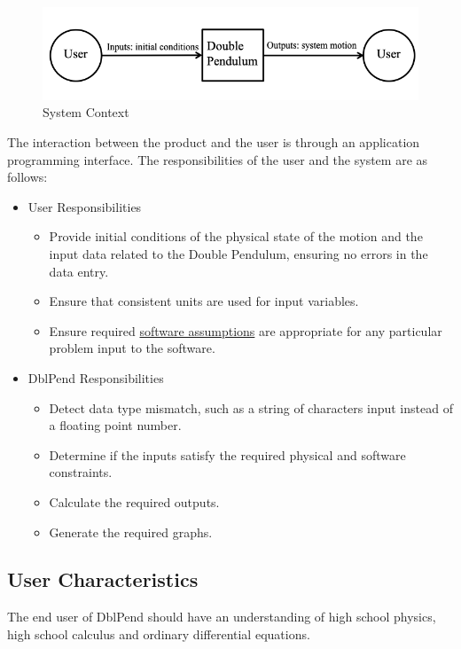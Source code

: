 \documentclass[12pt]{article}
\begin{document}
{\begin{figure}[H]
\begin{center}
\includegraphics[width=\textwidth]{../../../../datafiles/dblpend/SystemContextFigure.png}
\caption{System Context}
\label{Figure:sysCtxDiag}
\end{center}
\end{figure}
The interaction between the product and the user is through an application programming interface. The responsibilities of the user and the system are as follows:

\begin{itemize}
\item{User Responsibilities}
\begin{itemize}
\item{Provide initial conditions of the physical state of the motion and the input data related to the Double Pendulum, ensuring no errors in the data entry.}
\item{Ensure that consistent units are used for input variables.}
\item{Ensure required \hyperref[Sec:Assumps]{software assumptions} are appropriate for any particular problem input to the software.}
\end{itemize}
\item{DblPend Responsibilities}
\begin{itemize}
\item{Detect data type mismatch, such as a string of characters input instead of a floating point number.}
\item{Determine if the inputs satisfy the required physical and software constraints.}
\item{Calculate the required outputs.}
\item{Generate the required graphs.}
\end{itemize}
\end{itemize}
\subsection{User Characteristics}
\label{Sec:UserChars}
The end user of DblPend should have an understanding of high school physics, high school calculus and ordinary differential equations.

}
\end{document}
